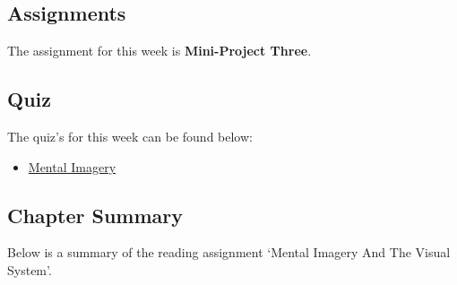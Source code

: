 \subsection{Assignments}

The assignment for this week is \textbf{Mini-Project Three}.  

\subsection{Quiz}

The quiz's for this week can be found below:

\begin{itemize}
    \item \href{https://applied.cs.colorado.edu/mod/quiz/view.php?id=49389}{Mental Imagery}  
\end{itemize}

\subsection{Chapter Summary}

Below is a summary of the reading assignment `Mental Imagery And The Visual System'.

